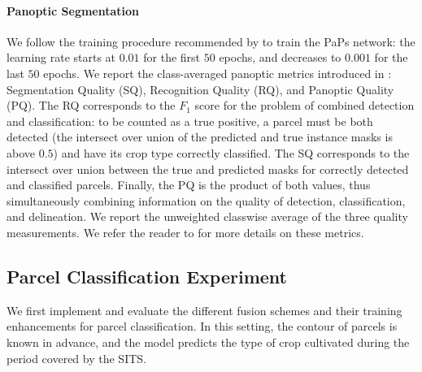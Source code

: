 \paragraph{\bf Panoptic Segmentation} We follow the training procedure recommended by \citet{garnot2021utae} to train the PaPs network: the learning rate starts at $0.01$ for the first $50$ epochs, and decreases to $0.001$ for the last $50$ epochs. We report the class-averaged panoptic metrics introduced in \citet{kirillov2019panoptic}: Segmentation Quality (SQ), Recognition Quality (RQ), and Panoptic Quality (PQ). 
The RQ corresponds to the $F_1$ score for the problem of combined detection and classification: to be counted as a true positive, a parcel must be both detected (the intersect over union of the predicted and true instance masks is above $0.5$) and have its crop type correctly classified.
The SQ corresponds to the intersect over union between the true and predicted masks for correctly detected and classified parcels. Finally, the PQ is the product of both values, thus simultaneously combining information on the quality of detection, classification, and delineation. We report the unweighted classwise average of the three quality measurements. We refer the reader to \citet{kirillov2019panoptic} for more details on these metrics.



\subsection{Parcel Classification Experiment}
We first implement and evaluate the different fusion schemes and their training enhancements for parcel classification. In this setting, the contour of parcels is known in advance, and the model predicts the type of crop cultivated during the period covered by the SITS.

